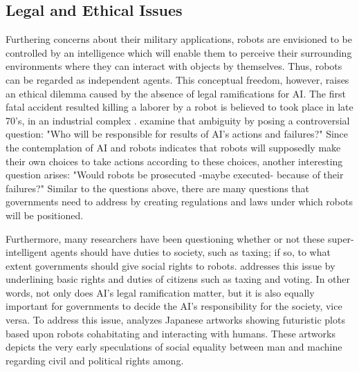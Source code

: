 \documentclass[man]{apa6}
\begin{document}
\subsection{Legal and Ethical Issues}
Furthering concerns about their military applications, robots are envisioned to be controlled by an intelligence which will enable them to perceive their surrounding environments where they can interact with objects by themselves.
Thus, robots can be regarded as independent agents.
This conceptual freedom, however, raises an ethical dilemma caused by the absence of legal ramifications for AI.
The first fatal accident resulted killing a laborer by a robot is believed to took place in late 70's, in an industrial complex \cite{lin}.
 examine that ambiguity by posing a controversial question: "Who will be responsible for results of AI's actions and failures?"
Since the contemplation of AI and robots indicates that robots will supposedly make their own choices to take actions according to these choices, another interesting question arises: "Would robots be prosecuted -maybe executed- because of their failures?"
Similar to the questions above, there are many questions that governments need to address by creating regulations and laws under which robots will be positioned. \par
Furthermore, many researchers have been questioning whether or not these super-intelligent agents should have duties to society, such as taxing; if so, to what extent governments should give social rights to robots.  addresses this issue by underlining basic rights and duties of citizens such as taxing and voting.
In other words, not only does AI's legal ramification matter, but it is also equally important for governments to decide the AI's responsibility for the society, vice versa.
To address this issue,  analyzes Japanese artworks showing futuristic plots based upon robots cohabitating and interacting with humans.
These artworks depicts the very early speculations of social equality between man and machine regarding civil and political rights among.
\end{document}
